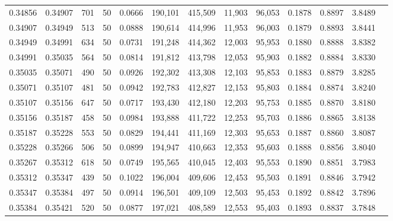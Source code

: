 \begin{tabular}{rrrrrrrrrrrrr}
0.34856 & 0.34907 &   701 &  50 &                                     0.0666 & 190,101 & 415,509 &  11,903 &  96,053 & 0.1878 & 0.8897 & 3.8489 \\
0.34907 & 0.34949 &   513 &  50 &                                     0.0888 & 190,614 & 414,996 &  11,953 &  96,003 & 0.1879 & 0.8893 & 3.8441 \\
0.34949 & 0.34991 &   634 &  50 &                                     0.0731 & 191,248 & 414,362 &  12,003 &  95,953 & 0.1880 & 0.8888 & 3.8382 \\
0.34991 & 0.35035 &   564 &  50 &                                     0.0814 & 191,812 & 413,798 &  12,053 &  95,903 & 0.1882 & 0.8884 & 3.8330 \\
0.35035 & 0.35071 &   490 &  50 &                                     0.0926 & 192,302 & 413,308 &  12,103 &  95,853 & 0.1883 & 0.8879 & 3.8285 \\
0.35071 & 0.35107 &   481 &  50 &                                     0.0942 & 192,783 & 412,827 &  12,153 &  95,803 & 0.1884 & 0.8874 & 3.8240 \\
0.35107 & 0.35156 &   647 &  50 &                                     0.0717 & 193,430 & 412,180 &  12,203 &  95,753 & 0.1885 & 0.8870 & 3.8180 \\
0.35156 & 0.35187 &   458 &  50 &                                     0.0984 & 193,888 & 411,722 &  12,253 &  95,703 & 0.1886 & 0.8865 & 3.8138 \\
0.35187 & 0.35228 &   553 &  50 &                                     0.0829 & 194,441 & 411,169 &  12,303 &  95,653 & 0.1887 & 0.8860 & 3.8087 \\
0.35228 & 0.35266 &   506 &  50 &                                     0.0899 & 194,947 & 410,663 &  12,353 &  95,603 & 0.1888 & 0.8856 & 3.8040 \\
0.35267 & 0.35312 &   618 &  50 &                                     0.0749 & 195,565 & 410,045 &  12,403 &  95,553 & 0.1890 & 0.8851 & 3.7983 \\
0.35312 & 0.35347 &   439 &  50 &                                     0.1022 & 196,004 & 409,606 &  12,453 &  95,503 & 0.1891 & 0.8846 & 3.7942 \\
0.35347 & 0.35384 &   497 &  50 &                                     0.0914 & 196,501 & 409,109 &  12,503 &  95,453 & 0.1892 & 0.8842 & 3.7896 \\
0.35384 & 0.35421 &   520 &  50 &                                     0.0877 & 197,021 & 408,589 &  12,553 &  95,403 & 0.1893 & 0.8837 & 3.7848 \\

\end{tabular}
